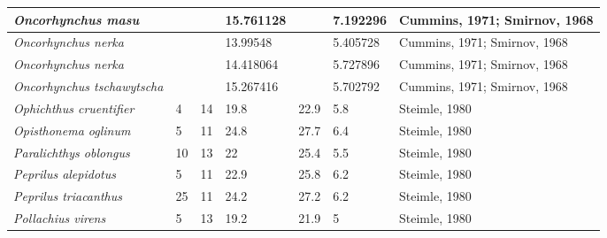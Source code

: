 \documentclass[a4paper]{article} %
\begin{document}
\begin{landscape}
\begin{longtable}[]{|l|p{1.8cm}|p{2cm}|p{2cm}|p{2.15cm}|p{1.9cm}|l|}
    \textit{Oncorhynchus masu}               &                              &                            & 15.761128                     &                                   & 7.192296                 & Cummins, 1971; Smirnov, 1968 \\ \hline
    \textit{Oncorhynchus nerka}              &                              &                            & 13.99548                      &                                   & 5.405728                 & Cummins, 1971; Smirnov, 1968 \\ \hline
    \textit{Oncorhynchus nerka}              &                              &                            & 14.418064                     &                                   & 5.727896                 & Cummins, 1971; Smirnov, 1968 \\ \hline
    \textit{Oncorhynchus tschawytscha}       &                              &                            & 15.267416                     &                                   & 5.702792                 & Cummins, 1971; Smirnov, 1968 \\ \hline
    \textit{Ophichthus cruentifier}          & 4                            & 14                         & 19.8                          & 22.9                              & 5.8                      & Steimle, 1980                \\ \hline
    \textit{Opisthonema oglinum}             & 5                            & 11                         & 24.8                          & 27.7                              & 6.4                      & Steimle, 1980                \\ \hline
    \textit{Paralichthys oblongus}           & 10                           & 13                         & 22                            & 25.4                              & 5.5                      & Steimle, 1980                \\ \hline
    \textit{Peprilus alepidotus}             & 5                            & 11                         & 22.9                          & 25.8                              & 6.2                      & Steimle, 1980                \\ \hline
    \textit{Peprilus triacanthus}            & 25                           & 11                         & 24.2                          & 27.2                              & 6.2                      & Steimle, 1980                \\ \hline
    \textit{Pollachius virens}               & 5                            & 13                         & 19.2                          & 21.9                              & 5                        & Steimle, 1980                \\ \hline

\end{longtable}
\end{landscape}
\end{document}
